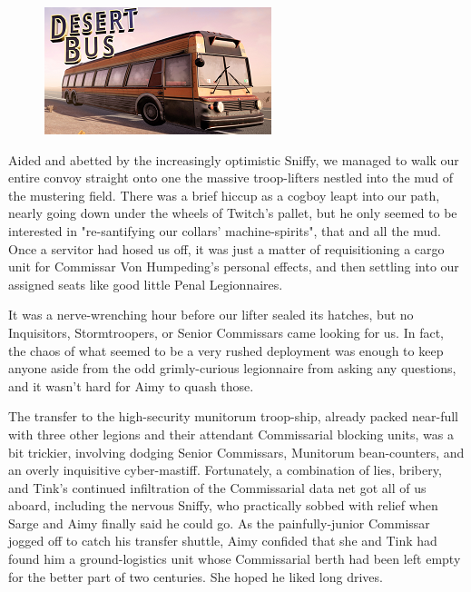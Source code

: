 \begin{figure}
	\begin{center}
		\includegraphics[width=\figwidth]{pics/21/117.png}
	\end{center}
\end{figure}
Aided and abetted by the increasingly optimistic Sniffy, we managed to walk our entire convoy straight onto one the massive troop-lifters nestled into the mud of the mustering field. 
There was a brief hiccup as a cogboy leapt into our path, nearly going down under the wheels of Twitch's pallet, but he only seemed to be interested in "re-santifying our collars' machine-spirits", that and all the mud. 
Once a servitor had hosed us off, it was just a matter of requisitioning a cargo unit for Commissar Von Humpeding's personal effects, and then settling into our assigned seats like good little Penal Legionnaires. 


It was a nerve-wrenching hour before our lifter sealed its hatches, but no Inquisitors, Stormtroopers, or Senior Commissars came looking for us. 
In fact, the chaos of what seemed to be a very rushed deployment was enough to keep anyone aside from the odd grimly-curious legionnaire from asking any questions, and it wasn't hard for Aimy to quash those. 


The transfer to the high-security munitorum troop-ship, already packed near-full with three other legions and their attendant Commissarial blocking units, was a bit trickier, involving dodging Senior Commissars, Munitorum bean-counters, and an overly inquisitive cyber-mastiff. 
Fortunately, a combination of lies, bribery, and Tink's continued infiltration of the Commissarial data net got all of us aboard, including the nervous Sniffy, who practically sobbed with relief when Sarge and Aimy finally said he could go. 
As the painfully-junior Commissar jogged off to catch his transfer shuttle, Aimy confided that she and Tink had found him a ground-logistics unit whose Commissarial berth had been left empty for the better part of two centuries. 
She hoped he liked long drives.

